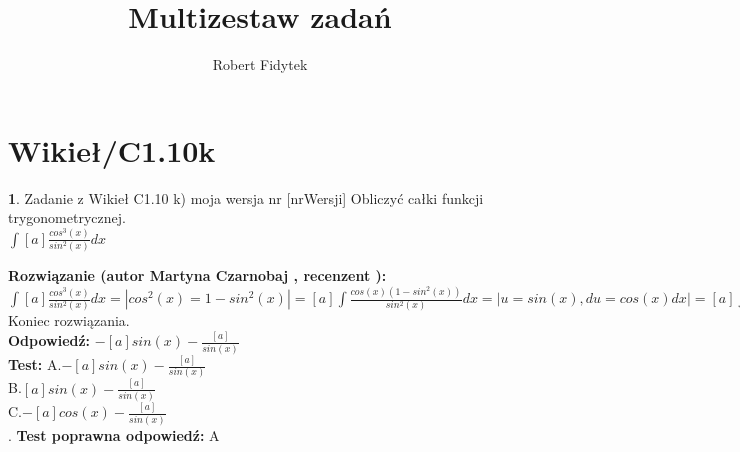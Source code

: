 \documentclass[12pt, a4paper]{article}
\title{Multizestaw zadań}
\author{Robert Fidytek}
\date{}
\theoremstyle{definition} %
\newtheorem{zad}{}
\newcommand{\kategoria}[1]{\section{#1}} %
\newcommand{\zadStart}[1]{\begin{zad}#1\newline} %
\newcommand{\zadStop}{\end{zad}}   %
\newcommand{\rozwStart}[2]{\noindent \textbf{Rozwiązanie (autor #1 , recenzent #2): }\newline} %
\newcommand{\rozwStop}{\newline}                                            %
\newcommand{\odpStart}{\noindent \textbf{Odpowiedź:}\newline}    %
\newcommand{\odpStop}{\newline}                                             %
\newcommand{\testStart}{\noindent \textbf{Test:}\newline} %
\newcommand{\testStop}{\newline} %
\newcommand{\kluczStart}{\noindent \textbf{Test poprawna odpowiedź:}\newline} %
\newcommand{\kluczStop}{\newline} %
\begin{document}
\maketitle


\kategoria{Wikieł/C1.10k}
\zadStart{Zadanie z Wikieł C1.10 k) moja wersja nr [nrWersji]}
Obliczyć całki funkcji trygonometrycznej.\\
$\int [a] \frac{cos^{3}(x)}{sin^{2}(x)} dx$\\
\zadStop
\rozwStart{Martyna Czarnobaj}{}
	$\int [a] \frac{cos^{3}(x)}{sin^{2}(x)} dx =| cos^{2}(x)=1-sin^{2}(x)| = [a] \int \frac{cos(x)(1-sin^{2}(x))}{sin^{2}(x)} dx = |u=sin(x), du=cos(x) dx| = [a] \int \frac{1 - u^{2}}{u^{2}} du = [a] \int \frac{1}{u^{2}} - 1 du = [a] (\int \frac{1}{u^{2}} du - \int 1 du) = [a] (-\frac{1}{u} - u) = -[a]u -\frac{[a]}{u} = -[a]sin(x) -\frac{[a]}{sin(x)}$\\ 


Koniec rozwiązania.\\
\rozwStop
\odpStart
$ -[a]sin(x) -\frac{[a]}{sin(x)}$\\
\odpStop
\testStart
A.$-[a]sin(x) -\frac{[a]}{sin(x)}$\\
B.$[a]sin(x) -\frac{[a]}{sin(x)}$\\
C.$-[a]cos(x) -\frac{[a]}{sin(x)}$\\
.
\testStop
\kluczStart
A
\kluczStop
\end{document}
